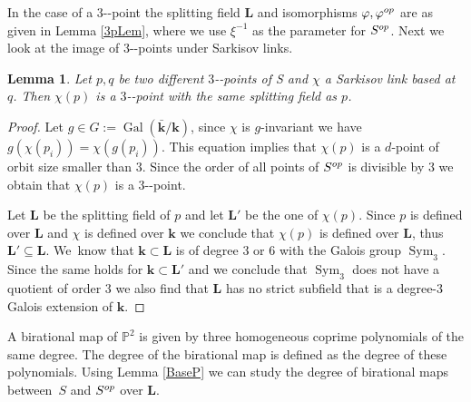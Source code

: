 \documentclass[10pt,a4paper]{amsart}
\providecommand{\nobreakdash}{\nobreak\hbox{-}}
\newcommand{\op}{\textup{op}}
\DeclareMathOperator{\Gal}{Gal}
\DeclareMathOperator{\Sym}{Sym}
\newtheorem{lemma}[theorem]{Lemma}
\theoremstyle{definition}
\newcommand{\kk}{{\boldsymbol{k}}}
\newcommand{\LL}{{\boldsymbol{L}}}
\begin{document}
In the case of a $3$\nobreakdash-point the splitting field $\LL$ and isomorphisms $\varphi, \varphi^{\op}$ are as given in Lemma \ref{3pLem}, where we use $\xi^{-1}$ as the parameter for $S^{\op}$. Next we look at the image of $3$\nobreakdash-points under Sarkisov links.

\begin{lemma} \label{ImageOf3P}
Let $p,q$ be two different $3$\nobreakdash-points of S and $\chi$ a Sarkisov link based at~$q$. Then $\chi(p)$ is a $3$\nobreakdash-point with the same splitting field as $p$.
\end{lemma}

\begin{proof}
Let $g \in G:= \Gal(\bar{\kk}/\kk)$, since $\chi$ is $g$-invariant we have $g(\chi(p_i)) = \chi(g(p_i))$. This equation implies that $\chi(p)$ is a $d$-point of orbit size smaller than $3$. Since the order of all points of $S^{\op}$ is divisible by $3$ we obtain that $\chi(p)$ is a $3$\nobreakdash-point.

Let $\LL$ be the splitting field of $p$ and let $\LL'$ be the one of $\chi(p)$. Since $p$ is defined over $\LL$ and $\chi$ is defined over $\kk$ we conclude that $\chi(p)$ is defined over $\LL$, thus $\LL' \subseteq \LL$. We~know that $\kk \subset\LL$ is of degree $3$ or $6$ with the Galois group $\Sym_3$. Since the same holds for $\kk \subset \LL'$ and we conclude that $\Sym_3$ does not have a quotient of order $3$ we also find that $\LL$ has no strict subfield that is a degree-$3$ Galois extension of $\kk$.
\end{proof}
A birational map of $\mathbb{P}^2$ is given by three homogeneous coprime polynomials of the same degree. The degree of the birational map is defined as the degree of these polynomials. Using Lemma \ref{BaseP} we can study the degree of birational maps between~$S$ and $S^{\op}$ over $\LL$.
\end{document}
